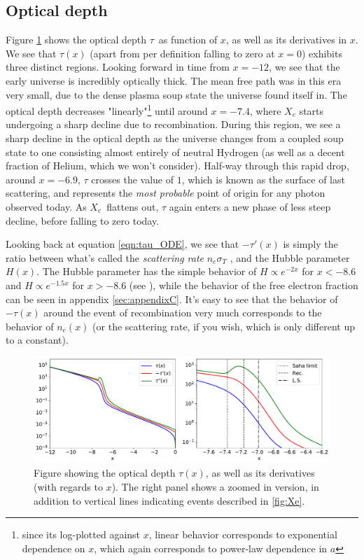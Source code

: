 \documentclass[10pt, a4paper]{article}
\renewcommand{\exp}{e^}
\renewcommand{\exp}{e^}
\begin{document}
\subsection{Optical depth}
Figure \ref{fig:tau} shows the optical depth $\tau$ as function of $x$, as well as its derivatives in $x$. We see that $\tau(x)$ (apart from per definition falling to zero at $x=0$) exhibits three distinct regions. Looking forward in time from $x=-12$, we see that the early universe is incredibly optically thick. The mean free path was in this era very small, due to the dense plasma soup state the universe found itself in. The optical depth decreases "linearly"\footnote{since its log-plotted against $x$, linear behavior corresponds to exponential dependence on $x$, which again corresponds to power-law dependence in $a$} until around $x=-7.4$, where $X_e$ starts undergoing a sharp decline due to recombination. During this region, we see a sharp decline in the optical depth as the universe changes from a coupled soup state to one consisting almost entirely of neutral Hydrogen (as well as a decent fraction of Helium, which we won't consider). Half-way through this rapid drop, around $x=-6.9$, $\tau$ crosses the value of $1$, which is known as the surface of last scattering, and represents the \textit{most probable} point of origin for any photon observed today. As $X_e$ flattens out, $\tau$ again enters a new phase of less steep decline, before falling to zero today.

Looking back at equation \ref{eqn:tau_ODE}, we see that $-\tau'(x)$ is simply the ratio between what's called the \textit{scattering rate} $n_e\sigma_T$ \cite[p. 72]{ModernCosmology2003}, and the Hubble parameter $H(x)$. The Hubble parameter has the simple behavior of $H\propto \exp{-2x}$ for $x<-8.6$ and $H\propto \exp{-1.5x}$ for $x>-8.6$ (see \cite{Milestone1}), while the behavior of the free electron fraction can be seen in appendix \ref{sec:appendixC}. It's easy to see that the behavior of $-\tau(x)$ around the event of recombination very much corresponds to the behavior of $n_e(x)$ (or the scattering rate, if you wish, which is only different up to a constant).



\begin{figure}[H]
    \centering
    \includegraphics[scale=0.5]{../m2_figs/tau.pdf}
    \caption{Figure showing the optical depth $\tau(x)$, as well as its derivatives (with regards to $x$). The right panel shows a zoomed in version, in addition to vertical lines indicating events described in \ref{fig:Xe}.}
    \label{fig:tau}
\end{figure}
\end{document}
